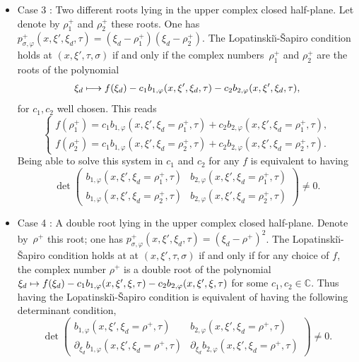 \documentclass[10pt]{amsart}
\newcommand\mto{\mathchoice{\longmapsto}{\mapsto}{\mapsto}{\mapsto}}
\theoremstyle{plain}
\theoremstyle{definition}
\def\C{\mathbb{C}}
\newcommand{\LS}{Lopatinski\u{\i}-\v{S}apiro\xspace}
\newcommand{\pconj}{p_{\sigma,\varphi}}
\begin{document}
\begin{itemize}
\item
Case 3 : Two different roots lying in the upper complex
closed half-plane. Let denote by $\rho^+_1$ and $\rho^+_2$ these
roots. One has
$\pconj^+ (x,\xi',\xi_d,\tau)=(\xi_d-\rho^+_1)(\xi_d-\rho^+_2)$.
The \LS condition holds at $(x,\xi',\tau,\sigma)$ if and only
if the complex numbers~$\rho^+_1$ and $\rho^+_2$ are the roots of
the polynomial\vspace*{-3pt}
\[
\xi_d\mto
f(\xi_d)-c_1b_{1,\varphi}(x,\xi',\xi_d,\tau)-c_2b_{2,\varphi}(x,\xi',\xi_d,\tau),
\]
for $c_1,c_2$ well chosen. This reads\vspace*{-3pt}
\begin{equation*}
\begin{cases}
f(\rho^+_1)= c_1b_{1,\varphi}(x,\xi',\xi_d=\rho^+_1,\tau)+c_2b_{2,\varphi}(x,\xi',\xi_d=\rho^+_1,\tau),\\
f(\rho^+_2)= c_1b_{1,\varphi}(x,\xi',\xi_d=\rho^+_2,\tau)+c_2b_{2,\varphi}(x,\xi',\xi_d=\rho^+_2,\tau).
\end{cases}
\end{equation*}
Being able to solve this system in $c_1$ and $c_2$ for any $f$ is equivalent to having
\begin{equation}\label{kan1}
\det
\begin{pmatrix}
b_{1,\varphi}(x,\xi',\xi_d=\rho^+_1,\tau) & b_{2,\varphi}(x,\xi',\xi_d=\rho^+_1,\tau) \\[
4pt]
b_{1,\varphi}(x,\xi',\xi_d=\rho^+_2,\tau) & b_{2,\varphi}(x,\xi',\xi_d=\rho^+_2,\tau)
\end{pmatrix}\neq 0.
\end{equation}

\item
Case 4 : A double root lying in the upper complex closed
half-plane. Denote by~$\rho^+$ this root; one has
$\pconj^+(x,\xi',\xi_d,\tau)=(\xi_d-\rho^+)^2$. The
\LS condition holds at at $(x,\xi',\tau,\sigma)$ if and only if for any choice of $f$, the
complex number $\rho^+$ is a double root of the polynomial
$\xi_d\mto f(\xi_d)-c_1
b_{1,\varphi}(x,\xi',\xi,\tau)-c_2b_{2,\varphi}(x,\xi',\xi,\tau)$
for some $c_1,c_2\in\C$. Thus having the
\LS condition is equivalent of having the following
determinant condition,\vspace*{-3pt}
\begin{equation}\label{kkan1}
\det
\begin{pmatrix}
b_{1,\varphi}(x,\xi',\xi_d=\rho^+,\tau) & b_{2,\varphi}(x,\xi',\xi_d=\rho^+,\tau) \\[
4pt]
\partial_{\xi_d}b_{1,\varphi}(x,\xi',\xi_d=\rho^+,\tau) & \partial_{\xi_d}b_{2,\varphi}(x,\xi',\xi_d=\rho^+,\tau)
\end{pmatrix}\neq 0.
\end{equation}
\end{itemize}
\end{document}

